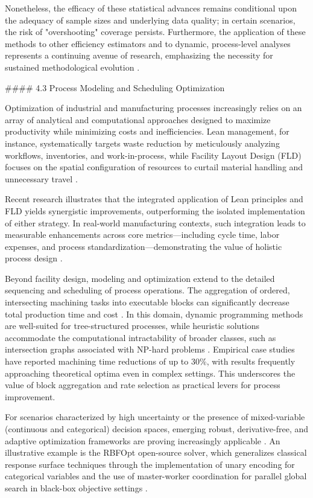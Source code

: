 \documentclass[11pt]{article}
\begin{document}
Nonetheless, the efficacy of these statistical advances remains conditional upon the adequacy of sample sizes and underlying data quality; in certain scenarios, the risk of "overshooting" coverage persists. Furthermore, the application of these methods to other efficiency estimators and to dynamic, process-level analyses represents a continuing avenue of research, emphasizing the necessity for sustained methodological evolution \cite{ref87}.

#### 4.3 Process Modeling and Scheduling Optimization

Optimization of industrial and manufacturing processes increasingly relies on an array of analytical and computational approaches designed to maximize productivity while minimizing costs and inefficiencies. Lean management, for instance, systematically targets waste reduction by meticulously analyzing workflows, inventories, and work-in-process, while Facility Layout Design (FLD) focuses on the spatial configuration of resources to curtail material handling and unnecessary travel \cite{ref81}.

Recent research illustrates that the integrated application of Lean principles and FLD yields synergistic improvements, outperforming the isolated implementation of either strategy. In real-world manufacturing contexts, such integration leads to measurable enhancements across core metrics—including cycle time, labor expenses, and process standardization—demonstrating the value of holistic process design \cite{ref81}.

Beyond facility design, modeling and optimization extend to the detailed sequencing and scheduling of process operations. The aggregation of ordered, intersecting machining tasks into executable blocks can significantly decrease total production time and cost \cite{ref82}. In this domain, dynamic programming methods are well-suited for tree-structured processes, while heuristic solutions accommodate the computational intractability of broader classes, such as intersection graphs associated with NP-hard problems \cite{ref82}. Empirical case studies have reported machining time reductions of up to 30\%, with results frequently approaching theoretical optima even in complex settings. This underscores the value of block aggregation and rate selection as practical levers for process improvement.

For scenarios characterized by high uncertainty or the presence of mixed-variable (continuous and categorical) decision spaces, emerging robust, derivative-free, and adaptive optimization frameworks are proving increasingly applicable \cite{ref77,ref78}. An illustrative example is the RBFOpt open-source solver, which generalizes classical response surface techniques through the implementation of unary encoding for categorical variables and the use of master-worker coordination for parallel global search in black-box objective settings \cite{ref77}.
\end{document}
